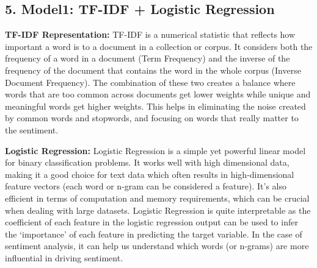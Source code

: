 \documentclass[11pt]{article}
\begin{document}
    \hypertarget{model1-tf-idf-logistic-regression}{%
\subsection{5. Model1: TF-IDF + Logistic
Regression}\label{model1-tf-idf-logistic-regression}}

\textbf{TF-IDF Representation:} TF-IDF is a numerical statistic that
reflects how important a word is to a document in a collection or
corpus. It considers both the frequency of a word in a document (Term
Frequency) and the inverse of the frequency of the document that
contains the word in the whole corpus (Inverse Document Frequency). The
combination of these two creates a balance where words that are too
common across documents get lower weights while unique and meaningful
words get higher weights. This helps in eliminating the noise created by
common words and stopwords, and focusing on words that really matter to
the sentiment.

\textbf{Logistic Regression:} Logistic Regression is a simple yet
powerful linear model for binary classification problems. It works well
with high dimensional data, making it a good choice for text data which
often results in high-dimensional feature vectors (each word or n-gram
can be considered a feature). It's also efficient in terms of
computation and memory requirements, which can be crucial when dealing
with large datasets. Logistic Regression is quite interpretable as the
coefficient of each feature in the logistic regression output can be
used to infer the `importance' of each feature in predicting the target
variable. In the case of sentiment analysis, it can help us understand
which words (or n-grams) are more influential in driving sentiment.
\end{document}
